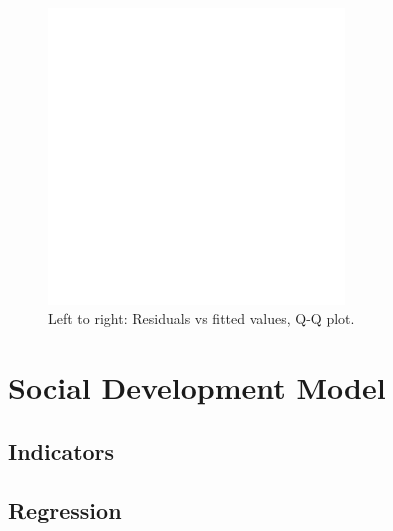 \documentclass[11pt]{article}
\begin{document}
\begin{figure}[!ht]
  \centering
  \includegraphics[width=0.7\textwidth]{images/science_model_conditions}
  \caption{\label{science_model_conditions}Left to right: Residuals vs fitted values, Q-Q plot.}
\end{figure}


\section{Social Development Model}
\label{sec:model_social}

\subsection{Indicators}

\subsection{Regression}
\end{document}
